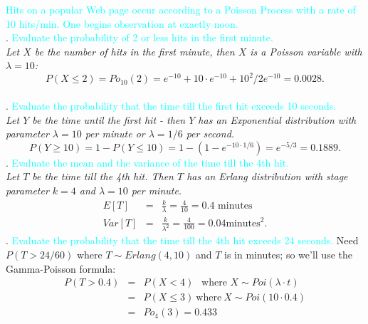 \documentclass[20pt,landscape]{foils}
\newcommand{\no}{\noindent}
\begin{document}
{{{{{{{{\foilhead[-.8in]{\textcolor{blue}{Example}}\vspace{.5cm}
\no  {\textcolor{magenta}{Hits on a website:}} {\textcolor{cyan}{Hits on a popular Web page occur according to a Poisson Process with
a rate of 10  hits/min. One begins observation at exactly noon.}}\\[.1in]
\no 1. {\textcolor{cyan}{Evaluate the probability of 2 or less hits in the first minute.}}\\[.1in]
{\it
Let $X$ be the number of hits in the first minute, then $X$ is a
Poisson variable with $\lambda = 10$:
\[
P(X \le 2) = Po_{10}(2) = e^{-10} + 10 \cdot  e^{-10}  + 10^{2}/2
e^{-10} = 0.0028.
\]
}\\[.1in]
\no 2. {\textcolor{cyan}{Evaluate the probability that the time till the first hit exceeds 10 seconds.}}\\[.1in]
{\it Let $Y$ be the time until the first hit - then $Y$ has an
Exponential distribution with parameter $\lambda = 10$ per minute or
$\lambda = 1/6$ per second.
\[
P(Y \ge 10) = 1 - P(Y \le 10) = 1 - (1 - e^{-10 \cdot 1/6}) =
e^{-5/3} = 0.1889.
\]}
\no 3. {\textcolor{cyan}{Evaluate the mean and the variance of the time till the 4th hit.}}\\[.1in]
{\it Let $T$ be the time till the 4th hit. Then $T$ has an Erlang
distribution with stage parameter $k = 4$ and $\lambda = 10$ per minute.
\begin{eqnarray*}
    E[T] &=& \frac{k}{\lambda} = \frac{4}{10} = 0.4 \text{ minutes} \\
    Var[T] &=& \frac{k}{\lambda^{2}} = \frac{4}{100} = 0.04 \text{minutes}^{2}.
\end{eqnarray*}}
%
\no 4. {\textcolor{cyan}{Evaluate the probability that the time till the 4th hit exceeds 24 seconds.}}
\no Need $P(T > 24/60)$ where $T \sim Erlang(4,10)$ and $T$ is in minutes; so we'll use the Gamma-Poisson formula:
\begin{eqnarray*}
    P(T > 0.4) &=& P(X<4) \ \ \mbox{ where } X \sim Poi(\lambda \cdot t)\\
    &=& P(X \le 3)\ \mbox{where}\ X \sim Poi(10 \cdot 0.4)\\
    &=& Po_{4}(3)=0.433%
\end{eqnarray*}
}}}}}}}}
\end{document}
